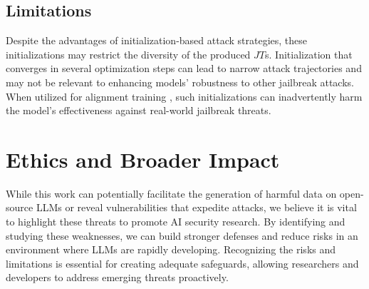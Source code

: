 \subsection{Limitations}
Despite the advantages of initialization-based attack strategies, these initializations may restrict the diversity of the produced $JT$s. Initialization that converges in several optimization steps can lead to narrow attack trajectories and may not be relevant to enhancing models' robustness to other jailbreak attacks. When utilized for alignment training \cite{mazeika2024harmbench}, such initializations can inadvertently harm the model's effectiveness against real-world jailbreak threats. 

\section{Ethics and Broader Impact}
\label{section:Ethics}

While this work can potentially facilitate the generation of harmful data on open-source LLMs or reveal vulnerabilities that expedite attacks, we believe it is vital to highlight these threats to promote AI security research. By identifying and studying these weaknesses, we can build stronger defenses and reduce risks in an environment where LLMs are rapidly developing. Recognizing the risks and limitations is essential for creating adequate safeguards, allowing researchers and developers to address emerging threats proactively.






